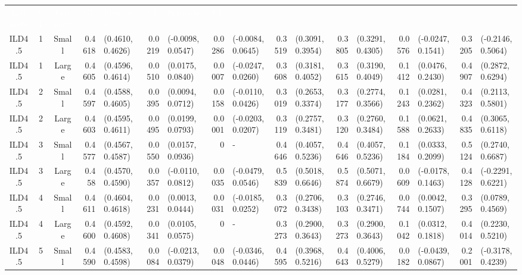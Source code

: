 \begin{landscape}
\begin{table}
\begin{tabular}{cccrlrlrlrlrlrlrl}
                \textcolor{white}{Estimate}	&	\multicolumn{1}{c}{\textcolor{white}{CI}}	&	\textcolor{white}{Estimate}	&	\multicolumn{1}{c}{\textcolor{white}{CI}}	&	
                \textcolor{white}{Estimate}	&	\multicolumn{1}{c}{\textcolor{white}{CI}}	&	\textcolor{white}{Estimate}	&	\multicolumn{1}{c}{\textcolor{white}{CI}}	\\
ILD4.5	&	1	&	Small	&	0.4618	&	(0.4610, 0.4626)	&	0.0219	&	(-0.0098, 0.0547)	&	0.0286	&	(-0.0084, 0.0645)	&	0.3519	&	(0.3091, 0.3954)	&	0.3805	&	(0.3291, 0.4305)	&	0.0576	&	(-0.0247, 0.1541)	&	0.3205	&	(-0.2146, 0.5064)	\\
ILD4.5	&	1	&	Large	&	0.4605	&	(0.4596, 0.4614)	&	0.0510	&	(0.0175, 0.0840)	&	0.0007	&	(-0.0247, 0.0260)	&	0.3608	&	(0.3181, 0.4052)	&	0.3615	&	(0.3190, 0.4049)	&	0.1412	&	(0.0476, 0.2430)	&	0.4907	&	(0.2872, 0.6294)	\\
ILD4.5	&	2	&	Small	&	0.4597	&	(0.4588, 0.4605)	&	0.0395	&	(0.0094, 0.0712)	&	0.0158	&	(-0.0110, 0.0426)	&	0.3019	&	(0.2653, 0.3374)	&	0.3177	&	(0.2774, 0.3566)	&	0.1243	&	(0.0281, 0.2362)	&	0.4323	&	(0.2113, 0.5801)	\\
ILD4.5	&	2	&	Large	&	0.4603	&	(0.4595, 0.4611)	&	0.0495	&	(0.0199, 0.0793)	&	0.0001	&	(-0.0203, 0.0207)	&	0.3119	&	(0.2757, 0.3481)	&	0.3120	&	(0.2760, 0.3484)	&	0.1588	&	(0.0621, 0.2633)	&	0.4835	&	(0.3065, 0.6118)	\\
ILD4.5	&	3	&	Small	&	0.4577	&	(0.4567, 0.4587)	&	0.0550	&	(0.0157, 0.0936)	&	0	&	-	&	0.4646	&	(0.4057, 0.5236)	&	0.4646	&	(0.4057, 0.5236)	&	0.1184	&	(0.0333, 0.2099)	&	0.5124	&	(0.2740, 0.6687)	\\
ILD4.5	&	3	&	Large	&	0.458	&	(0.4570, 0.4590)	&	0.0357	&	(-0.0110, 0.0812)	&	0.0035	&	(-0.0479, 0.0546)	&	0.5839	&	(0.5018, 0.6646)	&	0.5874	&	(0.5071, 0.6679)	&	0.0609	&	(-0.0178, 0.1463)	&	0.4128	&	(-0.2291, 0.6221)	\\
ILD4.5	&	4	&	Small	&	0.4611	&	(0.4604, 0.4618)	&	0.0231	&	(0.0013, 0.0444)	&	0.0031	&	(-0.0185, 0.0252)	&	0.3072	&	(0.2706, 0.3438)	&	0.3103	&	(0.2746, 0.3471)	&	0.0744	&	(0.0042, 0.1507)	&	0.3295	&	(0.0789, 0.4569)	\\
ILD4.5	&	4	&	Large	&	0.4600	&	(0.4592, 0.4608)	&	0.0341	&	(0.0105, 0.0575)	&	0	&	-	&	0.3273	&	(0.2900, 0.3643)	&	0.3273	&	(0.2900, 0.3643)	&	0.1042	&	(0.0312, 0.1818)	&	0.4014	&	(0.2230, 0.5210)	\\
ILD4.5	&	5	&	Small	&	0.4590	&	(0.4583, 0.4598)	&	0.0084	&	(-0.0213, 0.0379)	&	0.0048	&	(-0.0346, 0.0446)	&	0.4595	&	(0.3968, 0.5216)	&	0.4643	&	(0.4006, 0.5279)	&	0.0182	&	(-0.0439, 0.0867)	&	0.2001	&	(-0.3178, 0.4239)	\\

\end{tabular}
\end{table}
\end{landscape}
